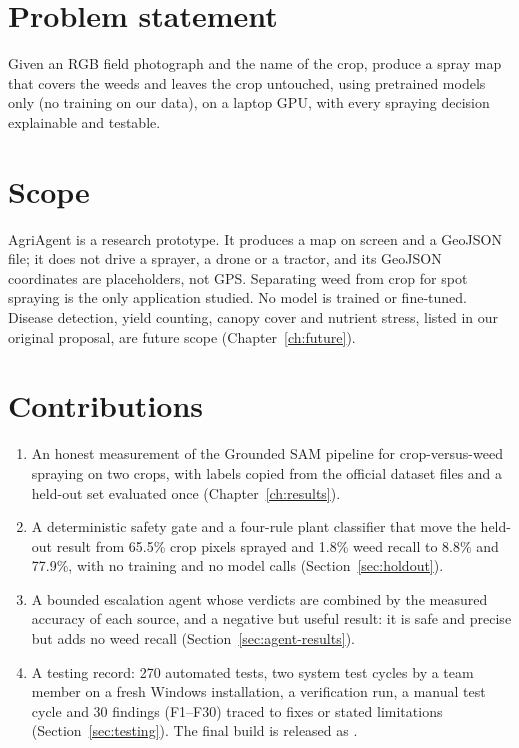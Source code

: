 \section{Problem statement}
Given an RGB field photograph and the name of the crop, produce a spray map that covers the weeds and
leaves the crop untouched, using pretrained models only (no training on our data), on a laptop GPU,
with every spraying decision explainable and testable.

\section{Scope}
AgriAgent is a research prototype. It produces a map on screen and a GeoJSON file; it does not drive a
sprayer, a drone or a tractor, and its GeoJSON coordinates are placeholders, not GPS. Separating weed
from crop for spot spraying is the only application studied. No model is trained or fine-tuned.
Disease detection, yield counting, canopy cover and nutrient stress, listed in our original proposal,
are future scope (Chapter~\ref{ch:future}).

\section{Contributions}
\begin{enumerate}
\item An honest measurement of the Grounded SAM pipeline for crop-versus-weed spraying on two crops,
  with labels copied from the official dataset files and a held-out set evaluated once
  (Chapter~\ref{ch:results}).
\item A deterministic safety gate and a four-rule plant classifier that move the held-out result from
  65.5\% crop pixels sprayed and 1.8\% weed recall to 8.8\% and 77.9\%, with no training and no model
  calls (Section~\ref{sec:holdout}).
\item A bounded escalation agent whose verdicts are combined by the measured accuracy of each source,
  and a negative but useful result: it is safe and precise but adds no weed recall
  (Section~\ref{sec:agent-results}).
\item A testing record: 270 automated tests, two system test cycles by a team member on a fresh
  Windows installation, a verification run, a manual test cycle and 30 findings (F1--F30) traced to
  fixes or stated limitations (Section~\ref{sec:testing}). The final build is released as
  .
\end{enumerate}

